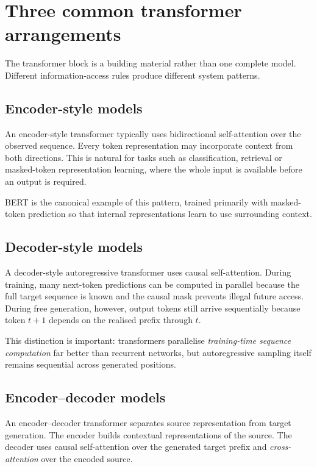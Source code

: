 \section{Three common transformer arrangements}

The transformer block is a building material rather than one complete model. Different information-access rules produce different system patterns.

\subsection{Encoder-style models}

An encoder-style transformer typically uses bidirectional self-attention over the observed sequence. Every token representation may incorporate context from both directions. This is natural for tasks such as classification, retrieval or masked-token representation learning, where the whole input is available before an output is required.

BERT is the canonical example of this pattern, trained primarily with masked-token prediction so that internal representations learn to use surrounding context.

\subsection{Decoder-style models}

A decoder-style autoregressive transformer uses causal self-attention. During training, many next-token predictions can be computed in parallel because the full target sequence is known and the causal mask prevents illegal future access. During free generation, however, output tokens still arrive sequentially because token \(t+1\) depends on the realised prefix through \(t\).

This distinction is important: transformers parallelise \emph{training-time sequence computation} far better than recurrent networks, but autoregressive sampling itself remains sequential across generated positions.

\subsection{Encoder--decoder models}

An encoder--decoder transformer separates source representation from target generation. The encoder builds contextual representations of the source. The decoder uses causal self-attention over the generated target prefix and \emph{cross-attention} over the encoded source.

